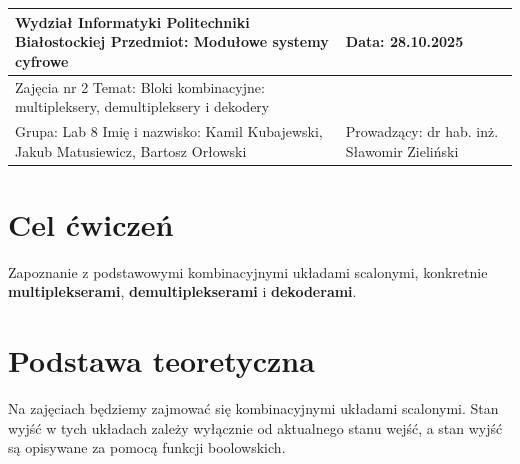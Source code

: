 \documentclass{article}
\begin{document}
\begin{center}
	
	\begin{tabular}{@{}|m{}|m{}|@{}}
		\hline
		Wydział Informatyki Politechniki Białostockiej \newline
		Przedmiot: Modułowe systemy cyfrowe
		&
		Data: 28.10.2025 \\ \hline
		
		Zajęcia nr 2 \newline
		Temat: Bloki kombinacyjne: multipleksery, demultipleksery i dekodery \newline
		
		& %
		
		
		\\
		
		Grupa: Lab 8 \newline
		Imię i nazwisko: \newline
		Kamil Kubajewski, Jakub Matusiewicz, Bartosz Orłowski
		
		& %
		
		Prowadzący: \newline
		dr hab. inż. Sławomir Zieliński \\ \hline
	\end{tabular}
\end{center}

\section{Cel ćwiczeń}

Zapoznanie z podstawowymi kombinacyjnymi układami scalonymi, konkretnie \textbf{multiplekserami}, \textbf{demultiplekserami} i \textbf{dekoderami}.

\section{Podstawa teoretyczna}

Na zajęciach będziemy zajmować się kombinacyjnymi
układami scalonymi. Stan wyjść w tych układach zależy wyłącznie od
aktualnego stanu wejść, a stan wyjść są opisywane za pomocą funkcji boolowskich\cite{maciak,wiki}.\\
\end{document}
